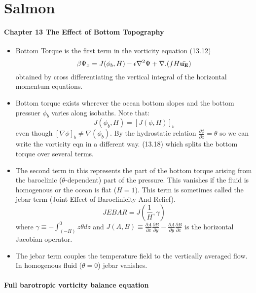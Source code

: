 \documentclass[..\Papers.tex]{subfiles}
\begin{document}
\section{Salmon}
\citep{Salmon}


\paragraph{Chapter 13 The Effect of Bottom Topography}
\begin{itemize}
    \item Bottom Torque is the first term in the vorticity equation (13.12)
        \begin{equation}
            \beta\Psi_x = J(\phi_b,H)-\epsilon\nabla^2\Psi +\nabla.(fH\bar{\bf{u}_E})
        \end{equation}
        obtained by cross differentiating the vertical integral of the horizontal momentum equations.
    \item Bottom torque exists wherever the ocean bottom slopes and the bottom pressuer $\phi_b$ varies along isobaths. Note that:
        \begin{equation}
            J(\phi_b,H)=[J(\phi,H)]_b
        \end{equation}
        even though $[\nabla\phi]_b \ne \nabla(\phi_b)$.
        By the hydrostatic relation $\frac{\partial\phi}{\partial z} =\theta$ so we can write the vorticity eqn in a different way. (13.18) which splits the bottom torque over several terms.
    \item The second term in this represents the part of the bottom torque arising from the baroclinic ($\theta$-dependent) part of the pressure. This vanishes if the fluid is homogenous or the ocean is flat ($H=1$). This term is sometimes called the jebar term (Joint Effect of Baroclinicity And Relief).
        \begin{equation}
            JEBAR = J(\frac{1}{H},\gamma)  
        \end{equation}
        where $\gamma \equiv -\int_(-H)^0 z\theta dz$ and $J(A,B)\equiv\frac{\partial A}{\partial x}\frac{\partial B}{\partial y} - \frac{\partial A}{\partial y}\frac{\partial B}{\partial x}$ is the horizontal Jacobian operator.
    \item The jebar term couples the temperature field to the vertically averaged flow. In homogenous fluid ($\theta=0$) jebar vanishes.

\end{itemize}

\paragraph{Full barotropic vorticity balance equation}
\end{document}
